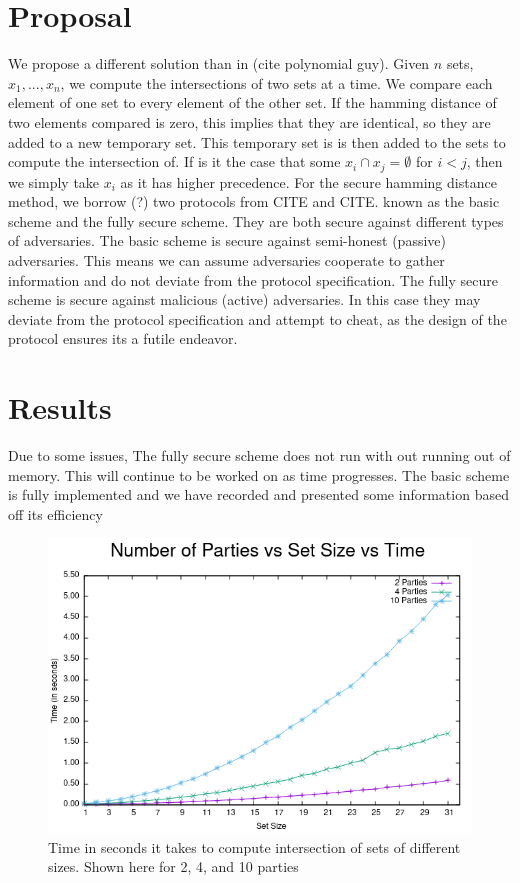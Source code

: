 \documentclass[10pt]{article}
\begin{document}
\section{Proposal}
We propose a different solution than in (cite polynomial guy). Given $n$ sets, $x_1,...,x_n$, we compute the intersections of two sets at a time. We compare each element of one set to every element of the other set. If the hamming distance of two elements compared is zero, this implies that they are identical, so they are added to a new temporary set. This temporary set is is then added to the sets to compute the intersection of. If is it the case that some $x_i \cap x_j = \emptyset$ for $i  < j$, then we simply take $x_i$ as it has higher precedence. For the secure hamming distance method, we borrow (?) two protocols from CITE and CITE. known as the basic scheme and the fully secure scheme. They are both secure against different types of adversaries. The basic scheme is secure against semi-honest (passive) adversaries. This means we can assume adversaries cooperate to gather information and do not deviate from the protocol specification. The fully secure scheme is secure against malicious (active) adversaries. In this case they may deviate from the protocol specification and attempt to cheat, as the design of the protocol ensures its a futile endeavor. 


\section{Results}
Due to some issues, The fully secure scheme does not run with out running out of memory. This will continue to be worked on as time progresses. The basic scheme is fully implemented and we have recorded and presented some information based off its efficiency


\begin{figure}[ht]
\centering
\includegraphics[scale=0.64]{g6} 
\caption{Time in seconds it takes to compute intersection of sets of different sizes. Shown here for 2, 4, and 10 parties}
\end{figure}
\end{document}
